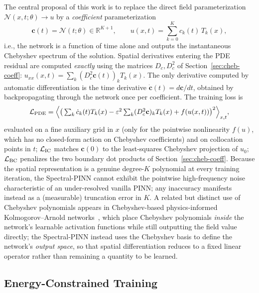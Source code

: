 \documentclass[symmetry,article,submit,moreauthors]{Definitions/mdpi}
\begin{document}
The central proposal of this work is to replace the direct field parameterization $\mathcal N(x,t;\theta)\to u$ by a \emph{coefficient} parameterization
\begin{equation}\label{eq:spectral-pinn}
\mathbf c(t)=\mathcal N(t;\theta)\in\mathbb R^{K+1}, \qquad u(x,t)=\sum_{k=0}^{K}c_k(t)\,T_k(x),
\end{equation}
i.e., the network is a function of time alone and outputs the instantaneous Chebyshev spectrum of the solution. Spatial derivatives entering the PDE residual are computed \emph{exactly} using the matrices $D_c,D_c^2$ of Section~\ref{sec:cheb-coeff}: $u_{xx}(x,t)=\sum_k(D_c^2\mathbf c(t))_kT_k(x)$. The only derivative computed by automatic differentiation is the time derivative $\dot{\mathbf c}(t)=d\mathbf c/dt$, obtained by backpropagating through the network once per coefficient. The training loss is
\begin{equation}
\mathcal L_{\rm PDE}=\Big\langle\big(\textstyle\sum_k\dot c_k(t)T_k(x)-\varepsilon^2\sum_k(D_c^2\mathbf c)_kT_k(x)+f(u(x,t))\big)^2\Big\rangle_{x,t},
\end{equation}
evaluated on a fine auxiliary grid in $x$ (only for the pointwise nonlinearity $f(u)$, which has no closed-form action on Chebyshev coefficients) and on collocation points in $t$; $\mathcal L_{\rm IC}$ matches $\mathbf c(0)$ to the least-squares Chebyshev projection of $u_0$; $\mathcal L_{\rm BC}$ penalizes the two boundary dot products of Section~\ref{sec:cheb-coeff}. Because the spatial representation is a genuine degree-$K$ polynomial at every training iteration, the Spectral-PINN cannot exhibit the pointwise high-frequency noise characteristic of an under-resolved vanilla PINN; any inaccuracy manifests instead as a (measurable) truncation error in $K$. A related but distinct use of Chebyshev polynomials appears in Chebyshev-based physics-informed Kolmogorov--Arnold networks~\cite{Mostajeran_cPIKAN2025}, which place Chebyshev polynomials \emph{inside} the network's learnable activation functions while still outputting the field value directly; the Spectral-PINN instead uses the Chebyshev basis to define the network's \emph{output space}, so that spatial differentiation reduces to a fixed linear operator rather than remaining a quantity to be learned.

\subsection{Energy-Constrained Training}\label{sec:energy-loss}
\end{document}
